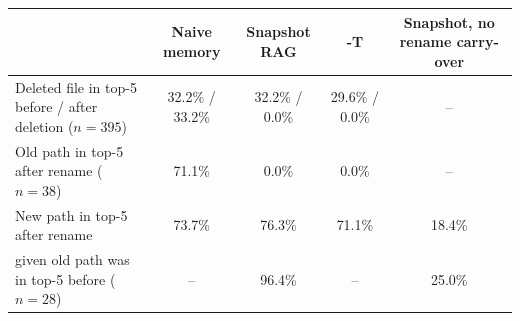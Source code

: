\begin{tabular}{lcccc}
\toprule
 & Naive memory & Snapshot RAG & \sys{}-T & Snapshot, no rename carry-over \\
\midrule
Deleted file in top-5 before / after deletion ($n=395$) & 32.2\% / 33.2\% & 32.2\% / 0.0\% & 29.6\% / 0.0\% & -- \\
Old path in top-5 after rename ($n=38$) & 71.1\% & 0.0\% & 0.0\% & -- \\
New path in top-5 after rename & 73.7\% & 76.3\% & 71.1\% & 18.4\% \\
\quad given old path was in top-5 before ($n=28$) & -- & 96.4\% & -- & 25.0\% \\
\bottomrule
\end{tabular}